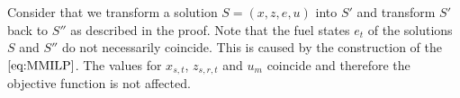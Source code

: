 \begin{remark}

Consider that we transform a solution ${S=(x,z,e,u)}$ into $S'$ and transform $S'$ back to $S''$ as described in the proof. Note that the fuel states $e_t$ of the solutions $S$ and $S''$ do not necessarily coincide. This is caused by the construction of the $\eqref{eq:MMILP}$. The values for $x_{s,t}$, $z_{s,r,t}$ and $u_m$ coincide and therefore the objective function is not affected.

\end{remark}
